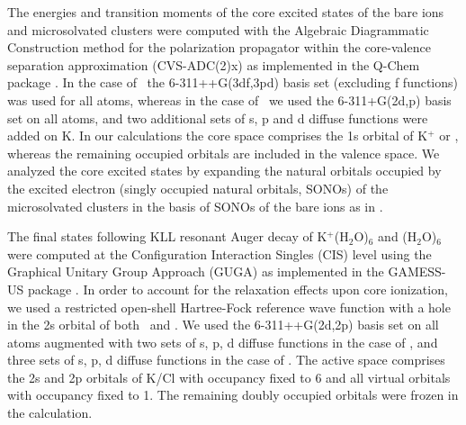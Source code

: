 The energies and transition moments of the core excited states of the bare ions and microsolvated clusters were computed with the Algebraic Diagrammatic Construction method for the polarization propagator \citep{sch82:2395} within the core-valence separation approximation \citep{bar85:867,ced80:206,ced81:1038} (CVS-ADC(2)x) as implemented in the Q-Chem package \citep{Wenzel14:1900,Wenzel14:4583,Wormit14:774,QChem2015}. In the case of \cli~the 6-311++G(3df,3pd) basis set \citep{Krishnan80:650,McLean80:5639} (excluding f functions) was used for all atoms, whereas in the case of \ki~we used the 6-311+G(2d,p) basis set \citep{Krishnan80:650,Blaudeau97:5016} on all atoms, and two additional sets of s, p and d diffuse functions were added on K. In our calculations the core space comprises the 1s orbital of K$^{+}$ or \cli, whereas the remaining occupied orbitals are included in the valence space. We analyzed the core excited states by expanding the natural orbitals occupied by the excited electron (singly occupied natural orbitals, SONOs) of the microsolvated clusters in the basis of SONOs of the bare ions as in \citep{miteva16:16671}. 

The final states following KLL resonant Auger decay of K$^{+}$(H$_2$O)$_6$ and \cli(H$_2$O)$_6$ were computed at the Configuration Interaction Singles (CIS) level using the Graphical Unitary Group Approach (GUGA) as implemented in the GAMESS-US package \citep{GUGA_PhysScr_21,GUGA_JCP_70,GUS}. In order to account for the relaxation effects upon core ionization, we used a restricted open-shell Hartree-Fock reference wave function with a hole in the 2s orbital of both \ki~and \cli.  We used the 6-311++G(2d,2p) basis set \citep{Krishnan80:650,McLean80:5639,Blaudeau97:5016} on all atoms augmented with two sets of s, p, d diffuse functions in the case of \ki, and three sets of s, p, d diffuse functions in the case of \cli. The active space comprises the 2s and 2p orbitals of K/Cl with occupancy fixed to 6 and all virtual orbitals with occupancy fixed to 1. The remaining doubly occupied orbitals were frozen in the calculation. \citep{mosnier16:061401}